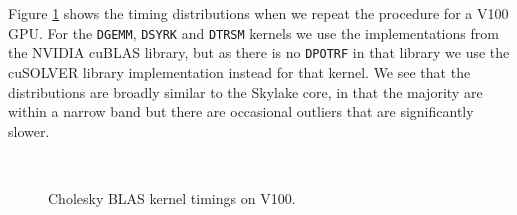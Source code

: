 \documentclass[runningheads]{llncs}
\begin{document}
Figure \ref{plot.v100_timings} shows the timing distributions when we repeat the procedure for a V100 GPU. For the {\tt DGEMM}, {\tt DSYRK} and {\tt DTRSM} kernels we use the implementations from the NVIDIA cuBLAS library, but as there is no {\tt DPOTRF} in that library we use the cuSOLVER library implementation instead for that kernel. We see that the distributions are broadly similar to the Skylake core, in that the majority are within a narrow band but there are occasional outliers that are significantly slower.
\begin{figure}
	\centering	
	\\	
	\caption{Cholesky BLAS kernel timings on V100.}	
	\label{plot.v100_timings}
\end{figure}
\end{document}
